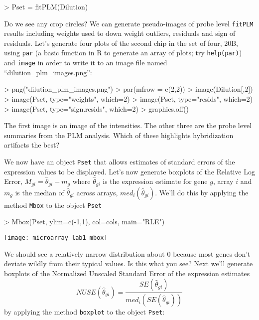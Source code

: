\documentclass[12pt]{article}
\newcommand{\code}[1]{{\texttt{#1}}}
\begin{document}
\begin{Schunk}
\begin{Sinput}
> Pset = fitPLM(Dilution)
\end{Sinput}
\end{Schunk}

Do we see any crop circles?  We can generate pseudo-images of probe level \code{fitPLM} results including weights used to down weight outliers, residuals and sign of residuals.  Let's generate four plots of the second chip in the set of four, 20B, using \code{par} (a basic function in R to generate an array of plots; try \code{help(par)}) and \code{image} in order to write it to an image file named ``dilution\_plm\_images.png'':

\begin{Schunk}
\begin{Sinput}
> png("dilution_plm_images.png")
> par(mfrow = c(2,2))
> image(Dilution[,2])
> image(Pset, type="weights", which=2)
> image(Pset, type="resids", which=2)
> image(Pset, type="sign.resids", which=2)
> graphics.off()
\end{Sinput}
\end{Schunk}

The first image is an image of the intensities.  The other three are the probe level summaries from the PLM analysis.  Which of these highlights hybridization artifacts the best?

We now have an object \code{Pset} that allows estimates of standard errors of the expression values to be displayed.  Let's now generate boxplots of the Relative Log Error, $M_{gi} = \hat{\theta}_{gi} - m_g$ where $\hat{\theta}_{gi}$ is the expression estimate for gene $g$, array $i$ and $m_g$ is the median of $\hat{\theta}_{gi}$ across arrays, $med_i(\hat{\theta}_{gi})$.  We'll do this by applying the method \code{Mbox} to the object \code{Pset}   

\begin{Schunk}
\begin{Sinput}
> Mbox(Pset, ylim=c(-1,1), col=cols, main="RLE")
\end{Sinput}
\end{Schunk}
\texttt{[image: microarray\_lab1-mbox]}

We should see a relatively narrow distribution about 0 because most genes don't deviate wildly from their typical values.  Is this what you see?  Next we'll generate boxplots of the Normalized Unscaled Standard Error of the expression estimates
\begin{equation}
	NUSE(\hat{\theta}_{gi}) = \frac{SE(\hat{\theta}_{gi})}{med_i(SE(\hat{\theta}_{gi}))}
\end{equation}
by applying the method \code{boxplot} to the object \code{Pset}:
\end{document}
